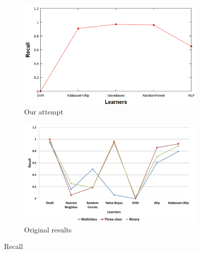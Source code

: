 \begin{figure}[H]
    \centering
    \begin{subfigure}[t]{0.5\textwidth}
        \includegraphics[width=\linewidth]{images/weka_recall.png}
        \caption{Our attempt}
    \end{subfigure}%
    \begin{subfigure}[t]{0.5\textwidth}
        \includegraphics[width=\linewidth]{images/weka_recall_cite.png}
        \caption{Original results \cite{borges_hink_machine_2014-1}}
    \end{subfigure}
    \caption{Recall}
\end{figure}

